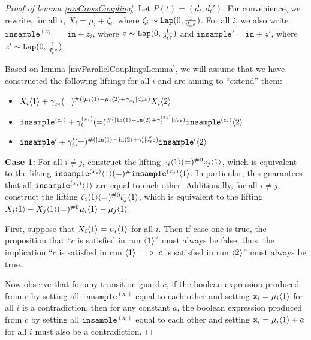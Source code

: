 \begin{proof}[Proof of lemma \ref{mvCrossCoupling}]
    Let $P(t) = (d_t, d_t')$. For convenience, we rewrite, for all $i$, $X_i = \mu_i + \zeta_i$, where $\zeta_i\sim \texttt{Lap}(0, \frac{1}{d_x\varepsilon})$. For all $i$, we also write $\texttt{insample}^{(x_i)} = \texttt{in} + z_i$, where $z \sim \texttt{Lap}(0, \frac{1}{d_t\varepsilon})$ and $\texttt{insample}' = \texttt{in} + z'$, where $z' \sim \texttt{Lap}(0, \frac{1}{d_t'\varepsilon})$.

    Based on lemma \ref{mvParallelCouplingsLemma}, we will assume that we have constructed the following liftings for all $i$ and are aiming to ``extend'' them: \begin{itemize}
        \item $X_i\langle1 \rangle +\gamma_{x_i}(=)^{\#(|\mu_i\langle1 \rangle-\mu_i\langle2 \rangle+\gamma_{x_i}|d_x\varepsilon)}X_i\langle2 \rangle$
        \item $\texttt{insample}^{(\texttt{x}_i)} + \gamma_t^{(x_i)}(=)^{\#(|\texttt{in}\langle1 \rangle-\texttt{in}\langle2 \rangle+\gamma_t^{(x_i)}|d_t\varepsilon)}\texttt{insample}^{(\texttt{x}_i)}\langle2 \rangle$
        \item $\texttt{insample}' + \gamma_t'(=)^{\#(|\texttt{in}\langle1 \rangle-\texttt{in}\langle2 \rangle+\gamma_t'|d_t'\varepsilon)}\texttt{insample}'\langle2 \rangle$
    \end{itemize}

    \textbf{Case 1: } For all $i\neq j$, construct the lifting $z_i\langle1 \rangle(=)^{\#0}z_j\langle1 \rangle$, which is equivalent to the lifting $\texttt{insample}^{(x_i)}\langle1 \rangle(=)^{\#}\texttt{insample}^{(x_j)}\langle1 \rangle$. In particular, this guarantees that all $\texttt{insample}^{(x_i)}\langle1 \rangle$ are equal to each other. 
    Additionally, for all $i\neq j$, construct the lifting $\zeta_i\langle1 \rangle(=)^{\#0}\zeta_j\langle1 \rangle$, which is equivalent to the lifting $X_i\langle1 \rangle - X_j\langle1 \rangle (=)^{\#0}\mu_i\langle1 \rangle-\mu_j\langle1 \rangle$.

    First, suppose that $X_i\langle1 \rangle = \mu_i\langle1 \rangle$ for all $i$. Then if case one is true, the proposition that ``$c$ is satisfied in run $\langle1 \rangle$'' must always be false; thus, the implication ``$c$ is satisfied in run $\langle1 \rangle\implies c$ is satisfied in run $\langle2 \rangle$'' must always be true.

    Now observe that for any transition guard $c$, if the boolean expression produced from $c$ by setting all $\texttt{insample}^{(\texttt{x}_i)}$ equal to each other and setting $\texttt{x}_i = \mu_i\langle1 \rangle$ for all $i$ is a contradiction, then for any constant $a$, the boolean expression produced from $c$ by setting all $\texttt{insample}^{(\texttt{x}_i)}$ equal to each other and setting $\texttt{x}_i = \mu_i\langle1 \rangle+a$ for all $i$ must also be a contradiction. 


\end{proof}
